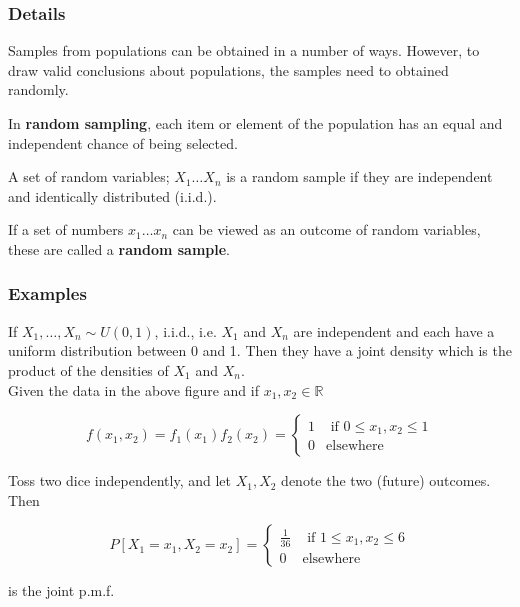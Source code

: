 \documentclass[12pt,a4paper]{article}
\theoremstyle{regla}
\theoremstyle{remark}
\theoremstyle{definition}
\theoremstyle{nonumberbreak}
\begin{document}
\subsubsection{Details}
Samples from populations can be obtained in a number of ways. However, to draw valid conclusions about populations, the samples need to obtained randomly.\\
\begin{defn}
In {\bf random sampling}, each item or element of the population has an equal and independent chance of being selected.
\end{defn}
A set of random variables; $X_1 \ldots X_n$ is a random sample if they are independent and identically distributed (i.i.d.).\\
\begin{defn}
If a set of numbers $x_1 \ldots x_n$ can be viewed as an outcome of random variables, these are called a {\bf random sample}.
\end{defn}
\subsubsection{Examples}
\begin{xmpl}

If $X_1, \ldots, X_n  \sim U(0,1)$, i.i.d., i.e.  $X_1$ and $X_n$ are independent and each have a uniform distribution between 0 and 1. Then they have a joint density which is the product of the densities of $X_1$ and $X_n$.\\

Given the data in the above figure and if  $x_1 , x_2 \in \mathbb{R}$

$$
f(x_1, x_2) = f_1(x_1) f_2(x_2) = \left \{ \begin{array}{rl}
1 &\mbox { if $0 \leq x_1, x_2 \leq 1$} \\
0 &\mbox {elsewhere}
\end{array} \right.
$$
\end{xmpl}
\begin{xmpl}

 Toss two dice independently, and let $X_1, X_2$ denote the two (future) outcomes.\\

Then 


$$
 P[X_1 = x_1, X_2 =  x_2]= \left \{ \begin{array}{rl}
\frac{1}{36} &\mbox { if $1 \leq x_1, x_2 \leq 6$} \\
0 &\mbox {elsewhere}
\end{array} \right .
$$

is the joint p.m.f.

\end{xmpl}
\end{document}
